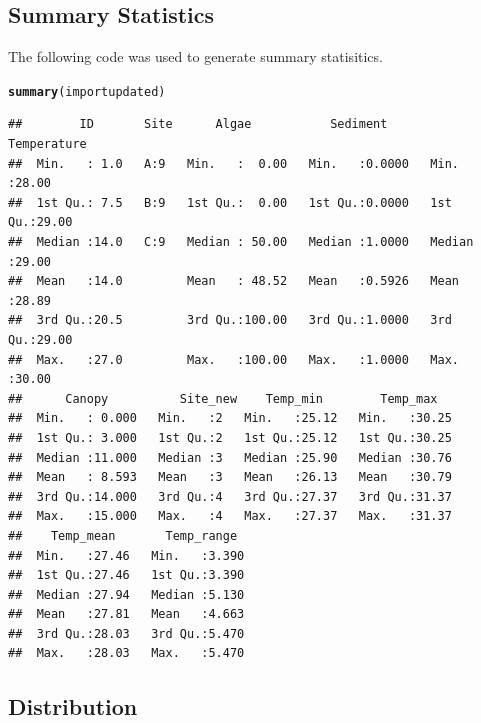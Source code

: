 \documentclass{article}\usepackage[]{graphicx}\usepackage[]{color}
\makeatletter
\newcommand{\hlstd}[1]{\textcolor[rgb]{0.345,0.345,0.345}{#1}}%
\newcommand{\hlkwd}[1]{\textcolor[rgb]{0.737,0.353,0.396}{\textbf{#1}}}%
\newenvironment{kframe}{%
 \def\at@end@of@kframe{}%
 \ifinner\ifhmode%
  \def\at@end@of@kframe{\end{minipage}}%
  \begin{minipage}{\columnwidth}%
 \fi\fi%
 \def\FrameCommand##1{\hskip\@totalleftmargin \hskip-\fboxsep
 \colorbox{shadecolor}{##1}\hskip-\fboxsep
     \hskip-\linewidth \hskip-\@totalleftmargin \hskip\columnwidth}%
 \MakeFramed {\advance\hsize-\width
   \@totalleftmargin\z@ \linewidth\hsize
   \@setminipage}}%
 {\par\unskip\endMakeFramed%
 \at@end@of@kframe}
\newenvironment{knitrout}{}{} %
\makeatother
\begin{document}
\subsection{Summary Statistics}

The following code was used to generate summary statisitics. 
\begin{knitrout}
\color{fgcolor}\begin{kframe}
\begin{alltt}
\hlkwd{summary}\hlstd{(importupdated)}
\end{alltt}
\begin{verbatim}
##        ID       Site      Algae           Sediment       Temperature   
##  Min.   : 1.0   A:9   Min.   :  0.00   Min.   :0.0000   Min.   :28.00  
##  1st Qu.: 7.5   B:9   1st Qu.:  0.00   1st Qu.:0.0000   1st Qu.:29.00  
##  Median :14.0   C:9   Median : 50.00   Median :1.0000   Median :29.00  
##  Mean   :14.0         Mean   : 48.52   Mean   :0.5926   Mean   :28.89  
##  3rd Qu.:20.5         3rd Qu.:100.00   3rd Qu.:1.0000   3rd Qu.:29.00  
##  Max.   :27.0         Max.   :100.00   Max.   :1.0000   Max.   :30.00  
##      Canopy          Site_new    Temp_min        Temp_max    
##  Min.   : 0.000   Min.   :2   Min.   :25.12   Min.   :30.25  
##  1st Qu.: 3.000   1st Qu.:2   1st Qu.:25.12   1st Qu.:30.25  
##  Median :11.000   Median :3   Median :25.90   Median :30.76  
##  Mean   : 8.593   Mean   :3   Mean   :26.13   Mean   :30.79  
##  3rd Qu.:14.000   3rd Qu.:4   3rd Qu.:27.37   3rd Qu.:31.37  
##  Max.   :15.000   Max.   :4   Max.   :27.37   Max.   :31.37  
##    Temp_mean       Temp_range   
##  Min.   :27.46   Min.   :3.390  
##  1st Qu.:27.46   1st Qu.:3.390  
##  Median :27.94   Median :5.130  
##  Mean   :27.81   Mean   :4.663  
##  3rd Qu.:28.03   3rd Qu.:5.470  
##  Max.   :28.03   Max.   :5.470
\end{verbatim}
\end{kframe}
\end{knitrout}


\subsection{Distribution}
\end{document}
